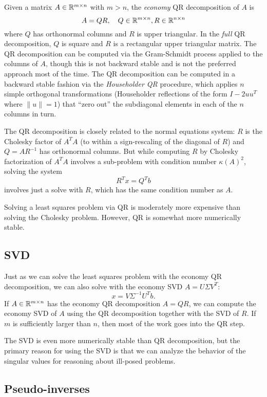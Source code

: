 \documentclass[12pt, leqno]{article}
\begin{document}
Given a matrix $A \in \mathbb{R}^{m \times n}$ with $m > n$, the {\em economy} QR
decomposition of $A$ is 
\[
  A = QR, \quad Q \in \mathbb{R}^{m \times n}, R \in \mathbb{R}^{n \times n}
\]
where $Q$ has orthonormal columns and $R$ is upper triangular.  In the
{\em full} QR decomposition, $Q$ is square and $R$ is a rectangular
upper triangular matrix.  The QR decomposition can be computed via the
Gram-Schmidt process applied to the columns of $A$, though this is not
backward stable and is not the preferred approach most of the time.
The QR decomposition can be computed in a backward stable fashion via
the {\em Householder QR} procedure, which applies $n$ simple
orthogonal transformations (Householder reflections of the form
$I-2uu^T$ where $\|u\| = 1$) that ``zero out'' the subdiagonal
elements in each of the $n$ columns in turn.

The QR decomposition is closely related to the normal equations
system: $R$ is the Cholesky factor of $A^T A$ (to within a
sign-rescaling of the diagonal of $R$) and $Q = A R^{-1}$ has
orthonormal columns.  But while computing $R$ by Cholesky
factorization of $A^T A$ involves a sub-problem with condition number
$\kappa(A)^2$, solving the system
\[
  R^T x = Q^T b
\]
involves just a solve with $R$, which has the same condition
number as $A$.

Solving a least squares problem via QR is moderately more expensive
than solving the Cholesky problem.  However, QR is somewhat more
numerically stable.

\subsection{SVD}

Just as we can solve the least squares problem with the economy QR
decomposition, we can also solve with the economy SVD $A = U \Sigma
V^T$:
\[
  x = V \Sigma^{-1} U^T b.
\]
If $A \in \mathbb{R}^{m \times n}$ has the economy QR decomposition
$A = QR$, we can compute the economy SVD of $A$ using the QR
decomposition together with the SVD of $R$.  If $m$ is sufficiently
larger than $n$, then most of the work goes into the QR step.

The SVD is even more numerically stable than QR decomposition,
but the primary reason for using the SVD is that we can analyze
the behavior of the singular values for reasoning about ill-posed
problems.

\subsection{Pseudo-inverses}
\end{document}
